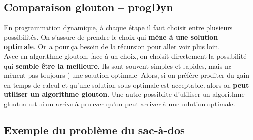 \documentclass[12pt,a4paper]{book}
\begin{document}
\subsection{Comparaison glouton -- progDyn}
En programmation dynamique, à chaque étape il faut choisir entre plusieurs possibilités. On s'assure de prendre le choix qui \textbf{mène à une solution optimale}. On a pour ça besoin de la récursion pour aller voir plus loin. \\

Avec un algorithme glouton, face à un choix, on choisit directement la possibilité qui \textbf{semble être la meilleure}. Ils sont souvent simples et rapides, mais ne mènent pas toujours ) une solution optimale. Alors, si on préfère proditer du gain en temps de calcul et qu'une solution sous-optimale est acceptable, alors on \textbf{peut utiliser un algorithme glouton}. Une autre possiblite d'utiliser un algorithme glouton est si on arrive à prouver qu'on peut arriver à une solution optimale.

\subsection{Exemple du problème du sac-à-dos}
\end{document}

